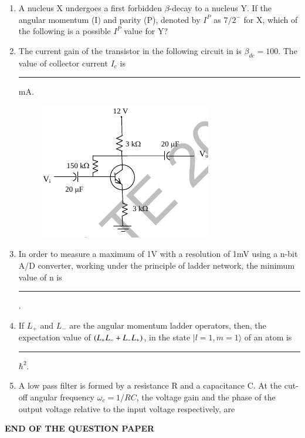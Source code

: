 \documentclass[journal,12pt,onecolumn]{IEEEtran}
\theoremstyle{remark}
\begin{document}
\begin{enumerate}
\item A nucleus X undergoes a first forbidden $\beta$-decay to a nucleus Y. If the angular momentum (I) and parity (P), denoted by $I^P$ as $7/2^-$ for X, which of the following is a possible $I^P$ value for Y?
\hfill{} \begin{enumerate}  \end{enumerate}

\item The current gain of the transistor in the following circuit in  is $\beta_{dc} = 100$. The value of collector current $I_c$ is \rule{3cm}{0.4pt} mA.
\hfill{}
\begin{figure}[H]
\centering
 \caption{} \label{fig:62} \includegraphics{figs/q62.png}
\end{figure}
\item In order to measure a maximum of 1V with a resolution of 1mV using a n-bit A/D converter, working under the principle of ladder network, the minimum value of n is \rule{3cm}{0.4pt}.\hfill{}

\item If $L_+$ and $L_-$ are the angular momentum ladder operators, then, the expectation value of $\left(L_+L_- + L_-L_+\right)$, in the state $|l=1, m=1\rangle$ of an atom is \rule{3cm}{0.4pt} $\hbar^2$.\hfill{}

\item A low pass filter is formed by a resistance R and a capacitance C. At the cut-off angular frequency $\omega_c = 1/RC$, the voltage gain and the phase of the output voltage relative to the input voltage respectively, are
\hfill{} \begin{enumerate}  \end{enumerate}
\end{enumerate}

\hrulefill
\textbf{END OF THE QUESTION PAPER}
\hrulefill
\end{document}
